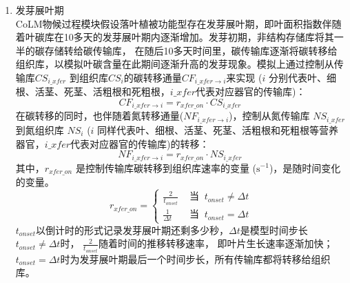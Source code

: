 \begin{enumerate}
\renewcommand{\theenumi}{\alph{enumi}}
\item 发芽展叶期\\
CoLM物候过程模块假设落叶植被功能型存在发芽展叶期，即叶面积指数伴随着叶碳库在10多天的发芽展叶期内逐渐增加。发芽初期，非结构存储库将其一半的碳存储转给碳传输库，
在随后10多天时间里，碳传输库逐渐将碳转移给组织库，以模拟叶碳含量在此期间逐渐升高的发芽现象。模拟上通过控制从传输库$CS_{i\_{xfer}}$
到组织库$CS_i$的碳转移通量$CF_{i\_{xfer}\rightarrow i}$来实现
($i$ 分别代表叶、细根、活茎、死茎、活粗根和死粗根，$i\_{xfer}$代表对应器官的传输库)：
\begin{equation}
  CF_{i\_{xfer}\rightarrow i} = r_{{xfer}\_{on}}\cdot CS_{i\_{xfer}}\ 
\end{equation}
在碳转移的同时，也伴随着氮转移通量($NF_{i\_{xfer}\rightarrow i}$)，控制从氮传输库 $NS_{i\_{xfer}}$ 到氮组织库 $NS_{i}$ ($i$ 同样代表叶、细根、活茎、死茎、活粗根和死粗根等营养器官，$i\_{xfer}$代表对应器官的传输库)的转移：
\begin{equation}
  NF_{i\_{xfer}\rightarrow i} = r_{{xfer}\_{on}}\cdot NS_{i\_{xfer}}\ 
\end{equation}
其中，$r_{{xfer}\_{on}}$ 是控制传输库碳转移到组织库速率的变量 ($\mathrm{s^{-1}}$)，是随时间变化的变量。
\begin{equation}
r_{xfer\_{on}}=\begin{cases}
\frac{2}{t_{ {onset}}} &  \text{ 当 }\ t_{ {onset}} \neq \Delta t \\ 
\frac{1}{\Delta t} &  \text{ 当 }\ t_{onset}=\Delta t
\end{cases}
\end{equation}
$t_{onset}$以倒计时的形式记录发芽展叶期还剩多少秒，$\Delta t$是模型时间步长$t_{onset}\neq\Delta t$时，
$\frac{2}{t_{onset}}$随着时间的推移转移速率，
即叶片生长速率逐渐加快；$t_{onset}=\Delta t$时为发芽展叶期最后一个时间步长，所有传输库都将转移给组织库。


\end{enumerate}

